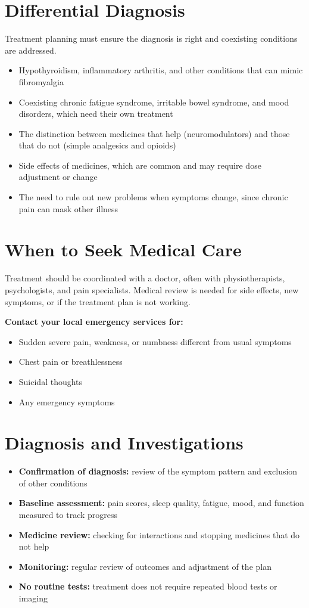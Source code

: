 \section*{Differential Diagnosis}
Treatment planning must ensure the diagnosis is right and coexisting conditions are addressed.
\begin{itemize}
    \item Hypothyroidism, inflammatory arthritis, and other conditions that can mimic fibromyalgia
    \item Coexisting chronic fatigue syndrome, irritable bowel syndrome, and mood disorders, which need their own treatment
    \item The distinction between medicines that help (neuromodulators) and those that do not (simple analgesics and opioids)
    \item Side effects of medicines, which are common and may require dose adjustment or change
    \item The need to rule out new problems when symptoms change, since chronic pain can mask other illness
\end{itemize}

\section*{When to Seek Medical Care}
Treatment should be coordinated with a doctor, often with physiotherapists, psychologists, and pain specialists. Medical review is needed for side effects, new symptoms, or if the treatment plan is not working.

\textbf{Contact your local emergency services for:}
\begin{itemize}
    \item Sudden severe pain, weakness, or numbness different from usual symptoms
    \item Chest pain or breathlessness
    \item Suicidal thoughts
    \item Any emergency symptoms
\end{itemize}

\section*{Diagnosis and Investigations}
\begin{itemize}
    \item \textbf{Confirmation of diagnosis:} review of the symptom pattern and exclusion of other conditions
    \item \textbf{Baseline assessment:} pain scores, sleep quality, fatigue, mood, and function measured to track progress
    \item \textbf{Medicine review:} checking for interactions and stopping medicines that do not help
    \item \textbf{Monitoring:} regular review of outcomes and adjustment of the plan
    \item \textbf{No routine tests:} treatment does not require repeated blood tests or imaging
\end{itemize}

